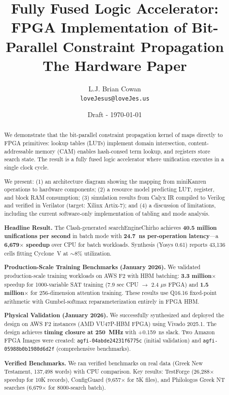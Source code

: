 \documentclass[11pt,a4paper]{article}
\title{Fully Fused Logic Accelerator:\\
FPGA Implementation of Bit-Parallel Constraint Propagation\\
\large The Hardware Paper}
\author{
  L.J. Brian Cowan \\
  \texttt{loveJesus@loveJes.us}
}
\date{Draft - \today}
\begin{document}
\maketitle

\begin{abstract}
We demonstrate that the bit-parallel constraint propagation kernel of
\fdmk{} maps directly to FPGA primitives: lookup tables (LUTs) implement
domain intersection, content-addressable memory (CAM) enables hash-consed
term lookup, and registers store search state. The result is a fully fused
logic accelerator where unification executes in a single clock cycle.

We present: (1) an architecture diagram showing the mapping from miniKanren
operations to hardware components; (2) a resource model predicting LUT,
register, and block RAM consumption; (3) simulation results from Calyx IR
compiled to Verilog and verified in Verilator (target: Xilinx Artix-7); and
(4) a discussion of limitations, including the current software-only
implementation of tabling and mode analysis.

\textbf{Headline Result.}
The Clash-generated searchEngineChirho achieves \textbf{40.5 million
unifications per second} in batch mode with \textbf{24.7~ns per-operation
latency}---a \textbf{6,679$\times$ speedup} over CPU for batch workloads.
Synthesis (Yosys 0.61) reports 43,136 cells fitting Cyclone~V at $\sim$8\%
utilization.

\textbf{Production-Scale Training Benchmarks (January 2026).}
We validated production-scale training workloads on AWS F2 with HBM batching:
\textbf{3.3 million$\times$} speedup for 1000-variable SAT training (7.9 sec CPU
$\to$ 2.4 $\mu$s FPGA) and \textbf{1.5 million$\times$} for 256-dimension
attention training. These results use Q16.16 fixed-point arithmetic with
Gumbel-softmax reparameterization entirely in FPGA HBM.

\textbf{Physical Validation (January 2026).}
We successfully synthesized and deployed the design on AWS F2 instances
(AMD VU47P-HBM FPGA) using Vivado 2025.1. The design achieves \textbf{timing
closure at 250~MHz} with +0.159~ns slack. Two Amazon FPGA Images were created:
\texttt{agfi-04abde24231f6775c} (initial validation) and
\texttt{agfi-05988b0b1980d6d2f} (comprehensive benchmarks).

\textbf{Verified Benchmarks.}
We ran verified benchmarks on real data (Greek New Testament, 137,498 words)
with CPU comparison. Key results: TestForge (26,288$\times$ speedup for 10K
records), ConfigGuard (9,657$\times$ for 5K files), and Philologos Greek NT
searches (6,679$\times$ for 8000-search batch).
\end{abstract}
\end{document}
